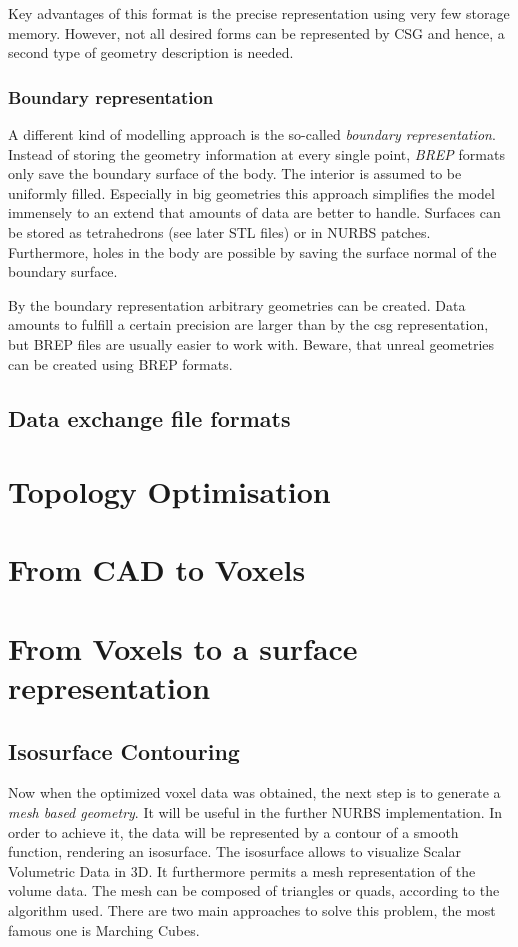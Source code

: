 Key advantages of this format is the precise representation using very few storage memory. However, not all desired forms can be represented by CSG and hence, a second type of geometry description is needed. 
\subsubsection{Boundary representation}
A different kind of modelling approach is the so-called \emph{boundary representation}. Instead of storing the geometry information at every single point, \emph{BREP} formats only save the boundary surface of the body. The interior is assumed to be uniformly filled. Especially in big geometries this approach simplifies the model immensely to an extend that amounts of data are better to handle. Surfaces can be stored as tetrahedrons (see later STL files) or in NURBS patches.
Furthermore, holes in the body are possible by saving the surface normal of the boundary surface. 

By the boundary representation arbitrary geometries can be created. Data amounts to fulfill a certain precision are larger than by the csg representation, but BREP files are usually easier to work with. Beware, that unreal geometries can be created using BREP formats.
\subsection{Data exchange file formats}


\section{Topology Optimisation}

\section{From CAD to Voxels}


\section{From Voxels to a surface representation}
\subsection{Isosurface Contouring}
Now when the optimized voxel data was obtained, the next step is to generate a \emph{mesh based
geometry}. It will be useful in the further NURBS implementation. In order to achieve it, the
data will be represented by a contour of a smooth function, rendering an isosurface. The
isosurface allows to visualize Scalar Volumetric Data in 3D. It furthermore permits a mesh
representation of the volume data. The mesh can be composed of triangles or quads, according
to the algorithm used. There are two main approaches to solve this problem, the most
famous one is Marching Cubes.


